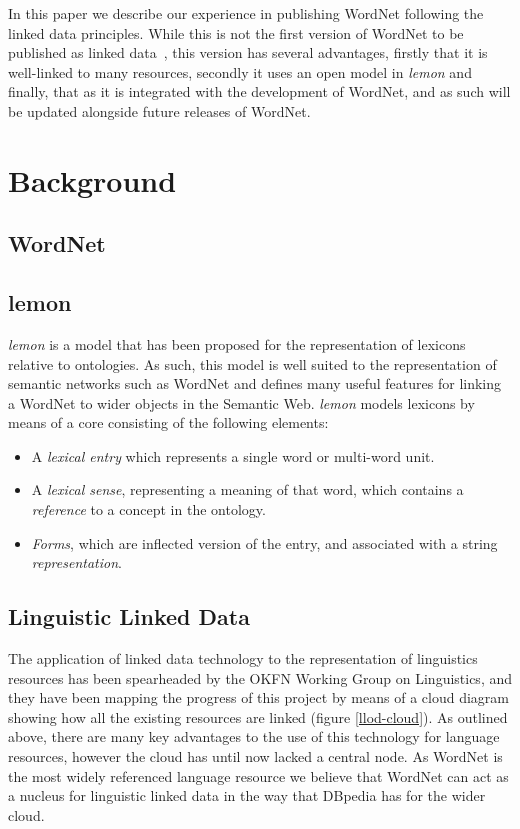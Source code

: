 \documentclass[10pt, a4paper]{article}
\newcommand{\lemon}[0]{\emph{lemon}}
\begin{document}
In this paper we describe our experience
in publishing WordNet following the linked data principles. While this is not
the first version of WordNet to be published as linked data~\cite{?, ?, ?}, this
version has several advantages, firstly that it is well-linked to many
resources, secondly it uses an open model in \emph{lemon} and finally, that as
it is integrated with the development of WordNet, and as such will be updated alongside
future releases of WordNet.

\section{Background}

\subsection{WordNet}


\subsection{lemon}

\lemon{} is a model that has been proposed\cite{} for the representation of
lexicons relative to ontologies. As such, this model is well suited to the
representation of semantic networks such as WordNet and defines many useful
features for linking a WordNet to wider objects in the Semantic Web. \lemon{}
models lexicons by means of a core consisting of the following elements:

\begin{itemize}
  \item A \emph{lexical entry} which represents a single word or multi-word
    unit.
  \item A \emph{lexical sense}, representing a meaning of that word, which
    contains a \emph{reference} to a concept in the ontology.
  \item \emph{Forms}, which are inflected version of the entry, and associated
    with a string \emph{representation}.
\end{itemize}

\subsection{Linguistic Linked Data}

The application of linked data technology to the representation of linguistics
resources has been spearheaded by the OKFN Working Group on Linguistics\cite{},
and they have been mapping the progress of this project by means of a cloud
diagram showing how all the existing resources are linked (figure
\ref{llod-cloud}). As outlined above, there are many key advantages to the use
of this technology for language resources, however the cloud has until now
lacked a central node. As WordNet is the most widely referenced language
resource we believe that WordNet can act as a nucleus for linguistic linked data
in the way that DBpedia has for the wider cloud.
\end{document}
